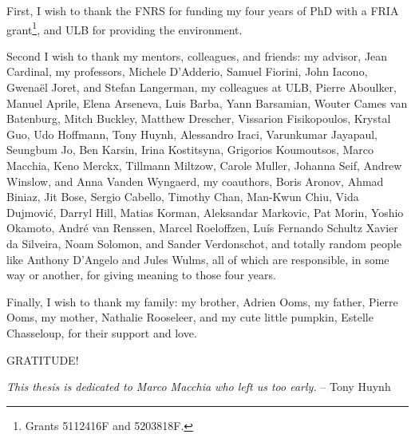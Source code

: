 
First, I wish to thank the FNRS for funding my four years of PhD with a FRIA
grant\footnote{%
Grants 5112416F and 5203818F.%
}, and ULB for providing the environment.

Second I wish to thank my mentors, colleagues, and friends:
%
my advisor,
Jean Cardinal,
%
my professors,
Michele D'Adderio,
Samuel Fiorini,
John Iacono,
Gwenaël Joret,
and
Stefan Langerman,
%
my colleagues at ULB,
Pierre Aboulker,
Manuel Aprile,
Elena Arseneva,
Luis Barba,
Yann Barsamian,
Wouter Cames van Batenburg,
Mitch Buckley,
Matthew Drescher,
Vissarion Fisikopoulos,
Krystal Guo,
Udo Hoffmann,
Tony Huynh,
Alessandro Iraci,
Varunkumar Jayapaul,
Seungbum Jo,
Ben Karsin,
Irina Kostitsyna,
Grigorios Koumoutsos,
Marco Macchia,
Keno Merckx,
Tillmann Miltzow,
Carole Muller,
Johanna Seif,
Andrew Winslow,
and
Anna Vanden Wyngaerd,
%
my coauthors,
Boris Aronov,
Ahmad Biniaz,
Jit Bose,
Sergio Cabello,
Timothy Chan,
Man-Kwun Chiu,
Vida Dujmovi\'c,
Darryl Hill,
Matias Korman,
Aleksandar Markovic,
Pat Morin,
Yoshio Okamoto,
André van Renssen,
Marcel Roeloffzen,
Luís Fernando Schultz Xavier da Silveira,
Noam Solomon,
and
Sander Verdonschot,
%
and
%
totally random people like
Anthony D'Angelo
and
Jules Wulms,
all of which are responsible, in some way or another, for giving meaning to
those four years.

Finally, I wish to thank my family:
my brother, Adrien Ooms,
my father, Pierre Ooms,
my mother, Nathalie Rooseleer,
%
and
%
my cute little pumpkin, Estelle Chasseloup,
for their support and love.

\vspace{\fill}
\centerline{\LARGE GRATITUDE!}
\vspace{\fill}
\centerline{\emph{This thesis is dedicated to Marco Macchia who left us too
early.} -- Tony Huynh}
\vspace{\fill}
